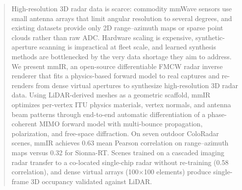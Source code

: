 \begin{abstract}
High-resolution 3D radar data is scarce: commodity mmWave sensors use small antenna arrays that limit angular resolution to several degrees, and existing datasets provide only 2D range--azimuth maps or sparse point clouds rather than raw ADC. Hardware scaling is expensive, synthetic-aperture scanning is impractical at fleet scale, and learned synthesis methods are bottlenecked by the very data shortage they aim to address.
%
We present mmIR, an open-source differentiable FMCW radar inverse renderer that fits a physics-based forward model to real captures and re-renders from dense virtual apertures to synthesize high-resolution 3D radar data. Using LiDAR-derived meshes as a geometric scaffold, mmIR optimizes per-vertex ITU physics materials, vertex normals, and antenna beam patterns through end-to-end automatic differentiation of a phase-coherent MIMO forward model with multi-bounce propagation, polarization, and free-space diffraction.
%
On seven outdoor ColoRadar scenes, mmIR achieves 0.63 mean Pearson correlation on range--azimuth maps versus 0.32 for Sionna-RT. Scenes trained on a cascaded imaging radar transfer to a co-located single-chip radar without re-training (0.58 correlation), and dense virtual arrays (100$\times$100 elements) produce single-frame 3D occupancy validated against LiDAR.

\end{abstract}
